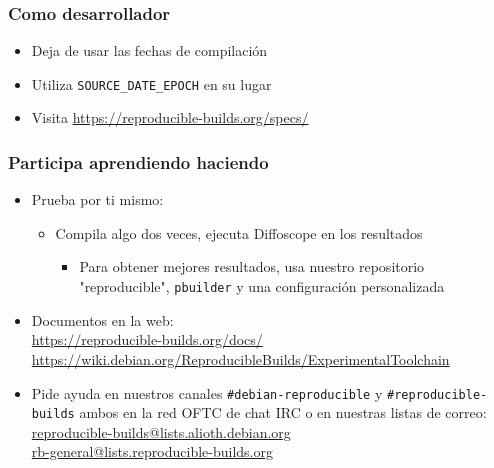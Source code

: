 \documentclass[14pt,aspectratio=169]{beamer}
\begin{document}
\begin{frame}
 \frametitle{Como desarrollador}
 \begin{itemize}
  \item Deja de usar las fechas de compilación
  \item Utiliza \texttt{SOURCE\_DATE\_EPOCH} en su lugar
  \item Visita \url{https://reproducible-builds.org/specs/}
 \end{itemize}
\end{frame}

\begin{frame}
 \frametitle{Participa aprendiendo haciendo}

 \begin{itemize}
  \item Prueba por ti mismo:
   \begin{itemize}
    \item Compila algo dos veces, ejecuta Diffoscope en los resultados
    \begin{itemize}
     \item Para obtener mejores resultados, usa nuestro repositorio "reproducible", \texttt{pbuilder} y una configuración personalizada
    \end{itemize}
   \end{itemize}
  \item Documentos en la web: \\
    \small{\url{https://reproducible-builds.org/docs/}} \\
    \small{\url{https://wiki.debian.org/ReproducibleBuilds/ExperimentalToolchain}}
  \item Pide ayuda en nuestros canales \texttt{\#debian-reproducible} y \texttt{\#reproducible-builds} ambos en la red OFTC de chat IRC o en nuestras listas de correo: \\
    \small{\url{reproducible-builds@lists.alioth.debian.org}} \\
    \small{\url{rb-general@lists.reproducible-builds.org}} 
 \end{itemize}
\end{frame}
\end{document}
